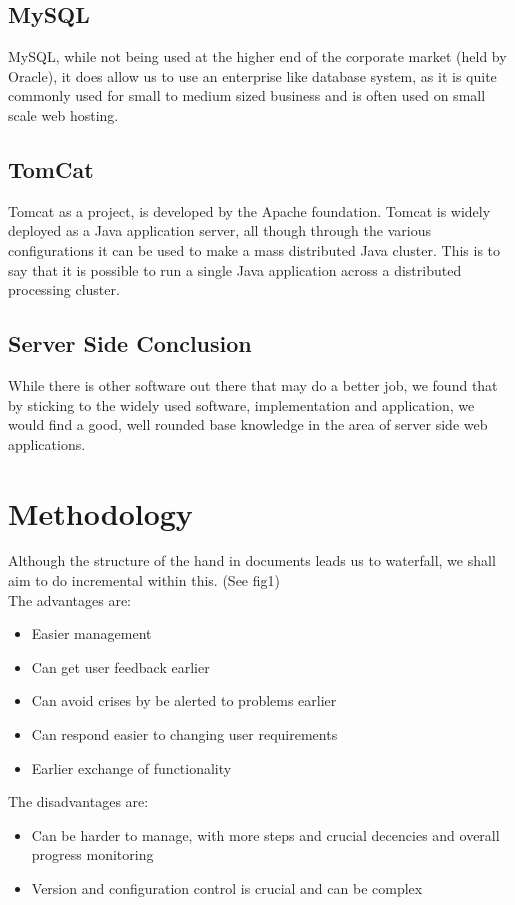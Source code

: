\documentclass{project}
\begin{document}
\subsection{MySQL}
MySQL, while not being used at the higher end of the corporate market (held by
Oracle), it does allow us to use an enterprise like database system, as it is quite
commonly used for small to medium sized business and is often used on small scale
web hosting.
\subsection{TomCat}
Tomcat as a project, is developed by the Apache foundation. Tomcat is widely
deployed as a Java application server, all though through the various configurations
it can be used to make a mass distributed Java cluster. This is to say that it is
possible to run a single Java application across a distributed processing cluster.
\subsection{Server Side Conclusion}
While there is other software out there that may do a better job, we found that by
sticking to the widely used software, implementation and application, we would find
a good, well rounded base knowledge in the area of server side web applications.
\section{Methodology}
Although the structure of the hand in documents leads us to waterfall, we shall aim
to do incremental within this. (See fig1)
\\
The advantages are:
\begin{itemize}
	\item Easier management
	\item Can get user feedback earlier
	\item Can avoid crises by be alerted to problems earlier
	\item Can respond easier to changing user requirements
	\item Earlier exchange of functionality
\end{itemize}

The disadvantages are:
\begin{itemize}
	\item Can be harder to manage, with more steps and crucial decencies and overall
progress monitoring
	\item Version and configuration control is crucial and can be complex
\end{itemize}
\end{document}
